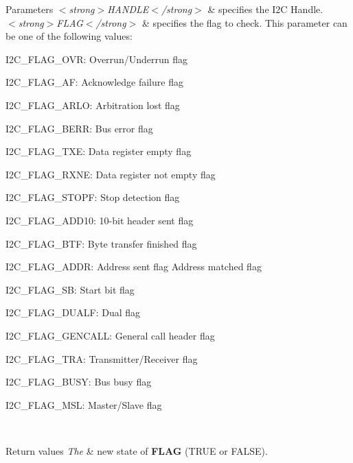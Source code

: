 \begin{DoxyParams}{Parameters}
{\em $<$strong$>$\+H\+A\+N\+D\+L\+E$<$/strong$>$} & specifies the I2C Handle. \\
\hline
{\em $<$strong$>$\+F\+L\+A\+G$<$/strong$>$} & specifies the flag to check. This parameter can be one of the following values\+: \begin{DoxyItemize}
\item I2\+C\+\_\+\+F\+L\+A\+G\+\_\+\+O\+VR\+: Overrun/\+Underrun flag \item I2\+C\+\_\+\+F\+L\+A\+G\+\_\+\+AF\+: Acknowledge failure flag \item I2\+C\+\_\+\+F\+L\+A\+G\+\_\+\+A\+R\+LO\+: Arbitration lost flag \item I2\+C\+\_\+\+F\+L\+A\+G\+\_\+\+B\+E\+RR\+: Bus error flag \item I2\+C\+\_\+\+F\+L\+A\+G\+\_\+\+T\+XE\+: Data register empty flag \item I2\+C\+\_\+\+F\+L\+A\+G\+\_\+\+R\+X\+NE\+: Data register not empty flag \item I2\+C\+\_\+\+F\+L\+A\+G\+\_\+\+S\+T\+O\+PF\+: Stop detection flag \item I2\+C\+\_\+\+F\+L\+A\+G\+\_\+\+A\+D\+D10\+: 10-\/bit header sent flag \item I2\+C\+\_\+\+F\+L\+A\+G\+\_\+\+B\+TF\+: Byte transfer finished flag \item I2\+C\+\_\+\+F\+L\+A\+G\+\_\+\+A\+D\+DR\+: Address sent flag Address matched flag \item I2\+C\+\_\+\+F\+L\+A\+G\+\_\+\+SB\+: Start bit flag \item I2\+C\+\_\+\+F\+L\+A\+G\+\_\+\+D\+U\+A\+LF\+: Dual flag \item I2\+C\+\_\+\+F\+L\+A\+G\+\_\+\+G\+E\+N\+C\+A\+LL\+: General call header flag \item I2\+C\+\_\+\+F\+L\+A\+G\+\_\+\+T\+RA\+: Transmitter/\+Receiver flag \item I2\+C\+\_\+\+F\+L\+A\+G\+\_\+\+B\+U\+SY\+: Bus busy flag \item I2\+C\+\_\+\+F\+L\+A\+G\+\_\+\+M\+SL\+: Master/\+Slave flag \end{DoxyItemize}
\\
\hline
\end{DoxyParams}

\begin{DoxyRetVals}{Return values}
{\em The} & new state of {\bfseries F\+L\+AG} (T\+R\+UE or F\+A\+L\+SE). \\
\hline
\end{DoxyRetVals}
\mbox{\label{group___i2_c___exported___macros_ga932024bf4a259e0cdaf9e50b38e3d41a}} 
